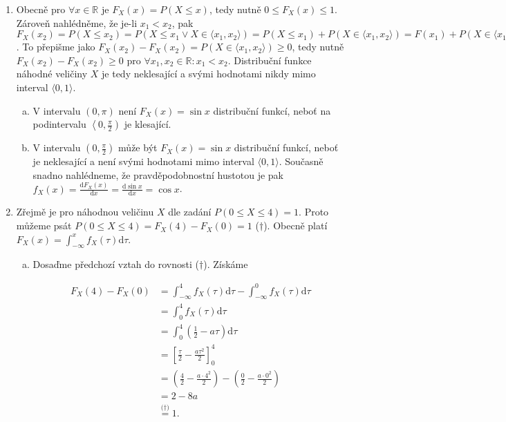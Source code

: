 ﻿\documentclass{article}
\begin{document}
\begin{enumerate}[1)]

\item Obecně pro $\forall x \in \mathbb{R}$ je $F_{X}(x) = P(X \leq x)$, tedy nutně $0 \leq F_{X}(x) \leq 1$. Zároveň nahlédněme, že je-li $x_{1} < x_{2}$, pak $F_{X}(x_{2}) = P(X \leq x_{2}) = P(X \leq x_{1} \lor X \in \langle x_{1}, x_{2}\rangle) = P(X \leq x_{1}) + P(X \in \langle x_{1}, x_{2}\rangle) = F(x_{1}) + P(X \in \langle x_{1}, x_{2}\rangle)$. To přepišme jako $F_{X}(x_{2}) - F_{X}(x_{2}) = P(X \in \langle x_{1}, x_{2}\rangle) \geq 0$, tedy nutně $F_{X}(x_{2}) - F_{X}(x_{2}) \geq 0$ pro $\forall x_{1}, x_{2} \in \mathbb{R}: x_{1} < x_{2}$. Distribuční funkce náhodné veličiny $X$ je tedy neklesající a svými hodnotami nikdy mimo interval $\langle 0, 1 \rangle$.

\begin{enumerate}[a)]
  \item V intervalu $( 0, \pi )$ není $F_{X}(x) = \sin x$ distribuční funkcí, neboť na podintervalu $\left\langle 0, \frac{\pi}{2} \right)$ je klesající.
  \item V intervalu $\left( 0, \frac{\pi}{2} \right)$ může být $F_{X}(x) = \sin x$ distribuční funkcí, neboť je neklesající a není svými hodnotami mimo interval $\langle 0, 1 \rangle$. Současně snadno nahlédneme, že pravděpodobnostní hustotou je pak $f_{X}(x) = \frac{\text{d} F_{X}(x)}{\text{d}x} = \frac{\text{d} \sin x}{\text{d}x} = \cos x$.
\end{enumerate}

\item Zřejmě je pro náhodnou veličinu $X$ dle zadání $P(0 \leq X \leq 4) = 1$. Proto můžeme psát $P(0 \leq X \leq 4) = F_{X}(4) - F_{X}(0) = 1$ ($\dagger$). Obecně platí $F_{X}(x) = \int_{-\infty}^{x} f_{X}(\tau) \text{d}\tau$.

\begin{enumerate}[a)]
\item Dosaďme předchozí vztah do rovnosti ($\dagger$). Získáme

\begin{equation*}
\begin{split}
  F_{X}(4) - F_{X}(0) &= \int_{-\infty}^{4} f_{X}(\tau) \text{d}\tau - \int_{-\infty}^{0} f_{X}(\tau) \text{d}\tau \\
  &= \int_{0}^{4} f_{X}(\tau) \text{d}\tau \\
  &= \int_{0}^{4} \left(\frac{1}{2} - a\tau \right) \text{d}\tau \\
  &= \left[ \frac{\tau}{2} - \frac{a\tau^{2}}{2} \right]_{0}^{4} \\
  &= \left( \frac{4}{2} - \frac{a \cdot 4^{2}}{2} \right) - \left( \frac{0}{2} - \frac{a \cdot 0^{2}}{2} \right)\\
  &= 2 - 8a \\
  &\stackrel{\text{($\dagger$)}}{=} 1 .
\end{split}
\end{equation*}


\end{enumerate}
\end{enumerate}
\end{document}
